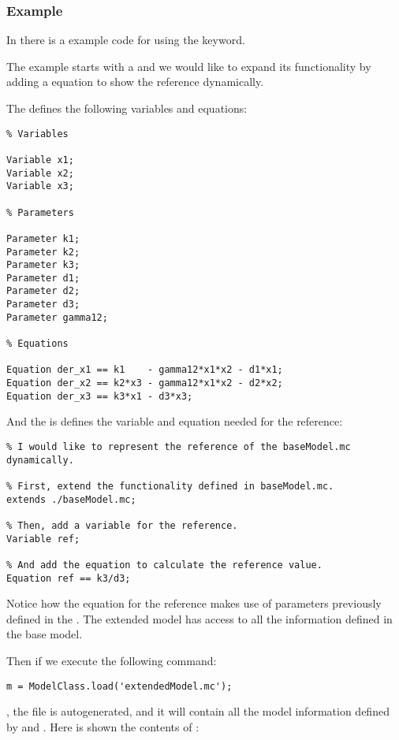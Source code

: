\documentclass[11pt]{article}
\begin{document}
\subsubsection{Example}

In  there is a example code for using the  keyword.

The example starts with a  and we would like to expand its functionality by adding a equation to show the reference dynamically.

The  defines the following variables and equations:

\begin{lstlisting}
% Variables

Variable x1;
Variable x2;
Variable x3;

% Parameters

Parameter k1;
Parameter k2;
Parameter k3;
Parameter d1;
Parameter d2;
Parameter d3;
Parameter gamma12;

% Equations

Equation der_x1 == k1    - gamma12*x1*x2 - d1*x1;
Equation der_x2 == k2*x3 - gamma12*x1*x2 - d2*x2;
Equation der_x3 == k3*x1 - d3*x3;
\end{lstlisting}

And the  is defines the variable and equation needed for the reference:

\begin{lstlisting}
% I would like to represent the reference of the baseModel.mc dynamically.

% First, extend the functionality defined in baseModel.mc.
extends ./baseModel.mc;

% Then, add a variable for the reference.
Variable ref;

% And add the equation to calculate the reference value.
Equation ref == k3/d3;
\end{lstlisting}

Notice how the equation for the reference  makes use of parameters previously defined in the . The extended model has access to all the information defined in the base model.

Then if we execute the following command:

\begin{lstlisting}
m = ModelClass.load('extendedModel.mc');
\end{lstlisting}

, the file  is autogenerated, and it will contain all the model information defined by  and . Here is shown the contents of :
\end{document}

